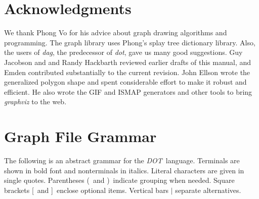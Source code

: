 \documentclass[11pt]{article}
\def\dot{{\it dot}}
\def\dag{{\it dag}}
\def\DOT{{\it DOT}}
\begin{document}
\section{Acknowledgments}
We thank Phong Vo for his advice
about graph drawing algorithms and programming.
The graph library uses Phong's splay tree dictionary library.
Also, the users of \dag, the predecessor of \dot, 
gave us many good suggestions.
Guy Jacobson and and Randy Hackbarth reviewed earlier
drafts of this manual, and Emden contributed substantially to the
current revision.  John Ellson wrote the generalized polygon
shape and spent considerable effort to make it robust and efficient.
He also wrote the GIF and ISMAP generators and other tools
to bring {\it graphviz} to the web.

\clearpage
 

\appendix
\clearpage
\section{Graph File Grammar}
\label{grammar}

\newcommand{\lopt}{[}
\newcommand{\ropt}{]}
\newcommand{\lgrp}{(}
\newcommand{\rgrp}{)}
\newcommand{\strict}{{\bf strict}}
\newcommand{\graph}{{\bf graph}}
\newcommand{\digraph}{{\bf digraph}}
\newcommand{\node}{{\bf node}}
\newcommand{\edge}{{\bf edge}}
\newcommand{\subgraph}{{\bf subgraph}}

The following is an abstract grammar for the \DOT\ language.
Terminals are shown in bold font and nonterminals in italics.
Literal characters are given in single quotes.
Parentheses \lgrp\ and \rgrp\ indicate grouping when needed.
Square brackets \lopt\ and \ropt\ enclose optional items.
Vertical bars $|$ separate alternatives.
\end{document}

